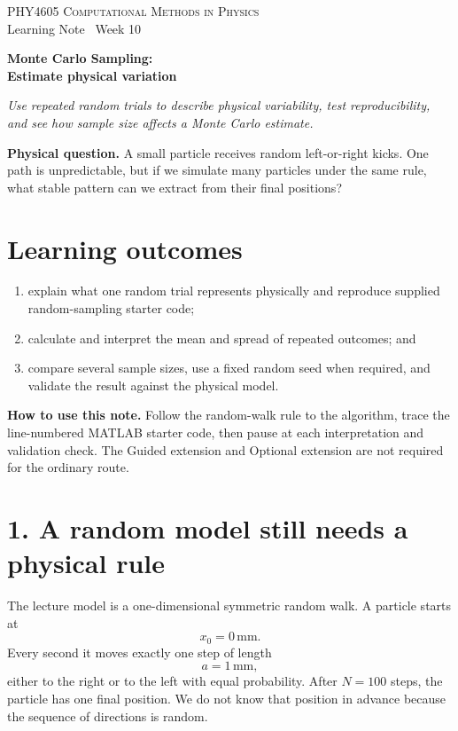 \documentclass[11pt,a4paper]{article}
\newcommand{\course}{PHY4605 Computational Methods in Physics}
\newcommand{\units}[1]{\,\mathrm{#1}}
\begin{document}
{\large\textsc{\course}}\\[-2pt]
{\small Learning Note \textbar\ Week 10}\par\vspace{4pt}
{\LARGE\bfseries Monte Carlo Sampling:\\Estimate physical variation}\par\vspace{3pt}
\textit{Use repeated random trials to describe physical variability, test reproducibility, and see how sample size affects a Monte Carlo estimate.}

\begin{keybox}\textbf{Physical question.} A small particle receives random left-or-right kicks. One path is unpredictable, but if we simulate many particles under the same rule, what stable pattern can we extract from their final positions?\end{keybox}

\section*{Learning outcomes}
\begin{enumerate}[nosep,leftmargin=5mm]
\item explain what one random trial represents physically and reproduce supplied random-sampling starter code;
\item calculate and interpret the mean and spread of repeated outcomes; and
\item compare several sample sizes, use a fixed random seed when required, and validate the result against the physical model.
\end{enumerate}

\textbf{How to use this note.} Follow the random-walk rule to the algorithm, trace the line-numbered MATLAB starter code, then pause at each interpretation and validation check. The Guided extension and Optional extension are not required for the ordinary route.

\section*{1. A random model still needs a physical rule}
The lecture model is a one-dimensional symmetric random walk. A particle starts at
\[
x_0=0\units{mm}.
\]
Every second it moves exactly one step of length
\[
a=1\units{mm},
\]
either to the right or to the left with equal probability. After $N=100$ steps, the particle has one final position. We do not know that position in advance because the sequence of directions is random.
\end{document}
